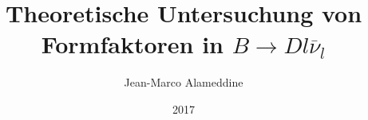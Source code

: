 \documentclass[
  tucolor,
  BCOR=12mm,     %
  parskip=half,  %
  open=any,      %
  cleardoublepage=plain,  %
]{tudothesis}
\author{Jean-Marco Alameddine}
\title{Theoretische Untersuchung von Formfaktoren in \texorpdfstring{$B \to D l \overline \nu_l$}{B -> D l nu_l}}
\date{2017}
\begin{document}
\frontmatter
%
\maketitle

\makecorrectorpage


\tableofcontents

\mainmatter





\appendix


\backmatter
\printbibliography

\cleardoublepage

\end{document}
